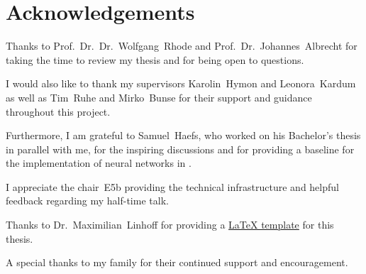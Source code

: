 \chapter*{Acknowledgements}

Thanks to
  Prof.~Dr.~Dr.~Wolfgang~Rhode and
  Prof.~Dr.~Johannes~Albrecht
  for taking the time to review my thesis
  and for being open to questions.

I would also like to thank
my supervisors
  Karolin~Hymon and
  Leonora~Kardum
as well as
  Tim~Ruhe and
  Mirko~Bunse
for their support and guidance throughout this project.

Furthermore,
I am grateful to Samuel~Haefs,
  who worked on his Bachelor's thesis in parallel with me,
for the inspiring discussions
and for providing a baseline for the implementation of neural networks in \dsea{}.

I appreciate the chair~E5b providing
  the technical infrastructure
  and helpful feedback
    regarding my half-time talk.

Thanks to Dr.~Maximilian~Linhoff for providing a \href{https://github.com/maxnoe/tudothesis}{\LaTeX{} template} for this thesis.

A special thanks to my family for their continued support and encouragement.
